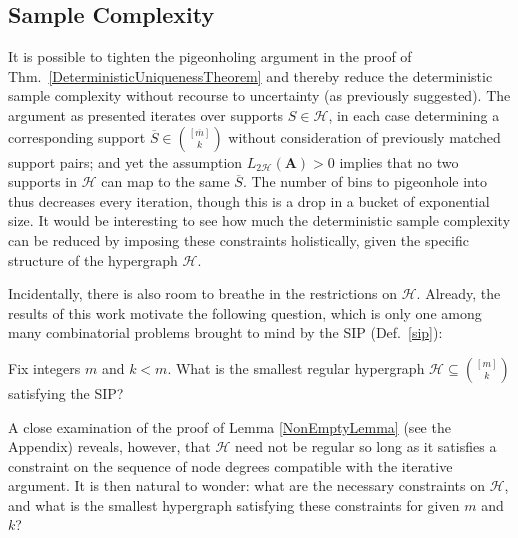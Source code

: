 \subsection{Sample Complexity}

It is possible to tighten the pigeonholing argument in the proof of Thm.~\ref{DeterministicUniquenessTheorem} and thereby reduce the deterministic sample complexity without recourse to uncertainty (as previously suggested). The argument as presented iterates over supports $S \in \mathcal{H}$, in each case determining a corresponding support $\overline S \in {[\overline m] \choose k}$ without consideration of previously matched support pairs; and yet the assumption $L_{2\mathcal{H}}(\mathbf{A}) > 0$ implies that no two supports in $\mathcal{H}$ can map to the same $\overline S$. The number of bins to pigeonhole into thus decreases every iteration, though this is a drop in a bucket of exponential size. It would be interesting to see how much the deterministic sample complexity can be reduced by imposing these constraints holistically, given the specific structure of the hypergraph $\mathcal{H}$.

Incidentally, there is also room to breathe in the restrictions on $\mathcal{H}$. Already, the results of this work motivate the following question, which is only one among many combinatorial problems brought to mind by the SIP (Def.~\ref{sip}):
\begin{question}
Fix integers $m$ and $k < m$. What is the smallest regular hypergraph $\mathcal{H} \subseteq {[m] \choose k}$ satisfying the SIP?
\end{question}

A close examination of the proof of Lemma \ref{NonEmptyLemma} (see the Appendix) reveals, however, that $\mathcal{H}$ need not be regular so long as it satisfies a constraint on the sequence of node degrees compatible with the iterative argument. It is then natural to wonder: what are the necessary constraints on $\mathcal{H}$, and what is the smallest hypergraph satisfying these constraints for given $m$ and $k$?

